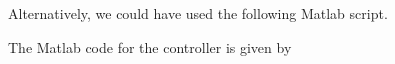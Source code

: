 Alternatively, we could have used the following Matlab script.



The Matlab code for the controller is given by 

